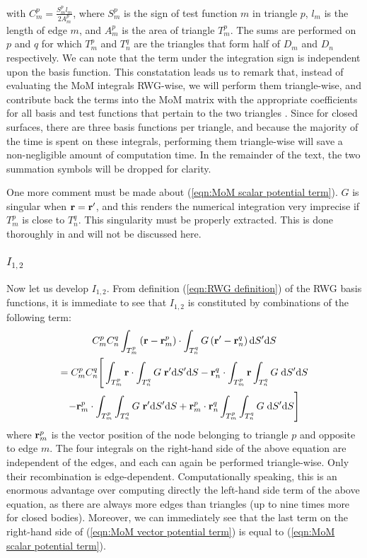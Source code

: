 with $C_m^p = \frac{S_m^p l_m}{2 A_m^p}$, where $S_m^p$ is the sign of test function $m$ in triangle $p$, $l_m$ is the length of edge $m$, and $A_m^p$ is the area of triangle $T_m^p$. The sums are performed on $p$ and $q$ for which $T_m^p$ and $T_n^q$ are the triangles that form half of $D_m$ and $D_n$ respectively. We can note that the term under the integration sign is independent upon the basis function. This constatation leads us to remark that, instead of evaluating the MoM integrals RWG-wise, we will perform them triangle-wise, and contribute back the terms into the MoM matrix with the appropriate coefficients for all basis and test functions that pertain to the two triangles \cite{Rao_82}. Since for closed surfaces, there are three basis functions per triangle, and because the majority of the time is spent on these integrals, performing them triangle-wise will save a non-negligible amount of computation time. In the remainder of the text, the two summation symbols will be dropped for clarity.
%
\par
One more comment must be made about (\ref{eqn:MoM scalar potential term}). $G$ is singular when $\mathbf{r} = \mathbf{r}'$, and this renders the numerical integration very imprecise if $T_m^p$ is close to $T_n^q$. This singularity must be properly extracted. This is done thoroughly in \cite{Taskinen_03} and will not be discussed here.

\subsubsection{$I_{1,2}$}
%
\par
Now let us develop $I_{1,2}$. From definition (\ref{eqn:RWG definition}) of the RWG basis functions, it is immediate to see that $I_{1,2}$ is constituted by combinations of the following term:
\begin{multline}  \label{eqn:MoM vector potential term}
C_m^p C_n^q \int_{T_m^p} \left(\mathbf{r}-\mathbf{r}_m^p \right) \cdot \int_{T_n^q} G \left(\mathbf{r}'-\mathbf{r}_n^q \right) \text{d} S' \text{d} S \\
= C_m^p C_n^q \Bigg[ \int_{T_m^p} \mathbf{r} \cdot \int_{T_n^q} G \; \mathbf{r}' \text{d} S' \text{d} S  - \mathbf{r}_n^q \cdot \int_{T_m^p} \mathbf{r} \int_{T_n^q} G \; \text{d} S' \text{d} S \\
- \mathbf{r}_m^p \cdot \int_{T_m^p} \int_{T_n^q} G \; \mathbf{r}' \text{d} S' \text{d} S + \mathbf{r}_m^p \cdot \mathbf{r}_n^q \int_{T_m^p} \int_{T_n^q} G \; \text{d} S' \text{d} S \Bigg]
\end{multline}
where $\mathbf{r}_m^p$ is the vector position of the node belonging to triangle $p$ and opposite to edge $m$. The four integrals on the right-hand side of the above equation are independent of the edges, and each can again be performed triangle-wise. Only their recombination is edge-dependent. Computationally speaking, this is an enormous advantage over computing directly the left-hand side term of the above equation, as there are always more edges than triangles (up to nine times more for closed bodies). Moreover, we can immediately see that the last term on the right-hand side of (\ref{eqn:MoM vector potential term}) is equal to (\ref{eqn:MoM scalar potential term}).

